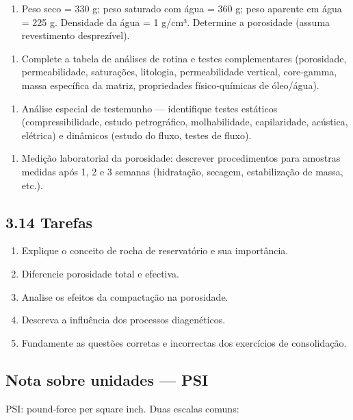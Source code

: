 \documentclass[11pt,a4paper]{article}
\begin{document}
\begin{enumerate}
\item Peso seco = 330 g; peso saturado com água = 360 g; peso aparente em água = 225 g. Densidade da água = 1 g/cm³. Determine a porosidade (assuma revestimento desprezível).
\end{enumerate}

\begin{enumerate}
\item Complete a tabela de análises de rotina e testes complementares (porosidade, permeabilidade, saturações, litologia, permeabilidade vertical, core‑gamma, massa específica da matriz, propriedades físico‑químicas de óleo/água).
\end{enumerate}

\begin{enumerate}
\item Análise especial de testemunho — identifique testes estáticos (compressibilidade, estudo petrográfico, molhabilidade, capilaridade, acústica, elétrica) e dinâmicos (estudo do fluxo, testes de fluxo).
\end{enumerate}

\begin{enumerate}
\item Medição laboratorial da porosidade: descrever procedimentos para amostras medidas após 1, 2 e 3 semanas (hidratação, secagem, estabilização de massa, etc.).
\end{enumerate}

\subsection{3.14 Tarefas}
\begin{enumerate}
\item Explique o conceito de rocha de reservatório e sua importância.
\item Diferencie porosidade total e efectiva.
\item Analise os efeitos da compactação na porosidade.
\item Descreva a influência dos processos diagenéticos.
\item Fundamente as questões corretas e incorrectas dos exercícios de consolidação.
\end{enumerate}

\subsection{Nota sobre unidades — PSI}
PSI: pound‑force per square inch. Duas escalas comuns:
\end{document}

